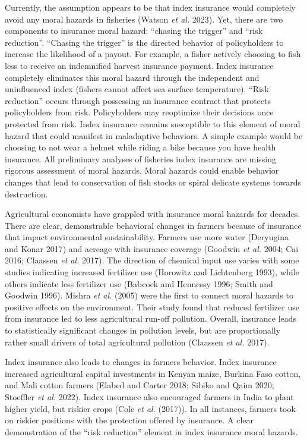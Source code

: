\documentclass[
  letterpaper,
  DIV=11,
  numbers=noendperiod]{scrartcl}
\theoremstyle{plain}
\theoremstyle{plain}
\theoremstyle{remark}
\begin{document}
Currently, the assumption appears to be that index insurance would
completely avoid any moral hazards in fisheries (Watson \emph{et al.}
2023). Yet, there are two components to insurance moral hazard:
``chasing the trigger'' and ``risk reduction''. ``Chasing the trigger''
is the directed behavior of policyholders to increase the likelihood of
a payout. For example, a fisher actively choosing to fish less to
receive an indemnified harvest insurance payment. Index insurance
completely eliminates this moral hazard through the independent and
uninfluenced index (fishers cannot affect sea surface temperature).
``Risk reduction'' occurs through possessing an insurance contract that
protects policyholders from risk. Policyholders may reoptimize their
decisions once protected from risk. Index insurance remains susceptible
to this element of moral hazard that could manifest in maladaptive
behaviors. A simple example would be choosing to not wear a helmet while
riding a bike because you have health insurance. All preliminary
analyses of fisheries index insurance are missing rigorous assessment of
moral hazards. Moral hazards could enable behavior changes that lead to
conservation of fish stocks or spiral delicate systems towards
destruction.

Agricultural economists have grappled with insurance moral hazards for
decades. There are clear, demonstrable behavioral changes in farmers
because of insurance that impact environmental sustainability. Farmers
use more water (Deryugina and Konar 2017) and acreage with insurance
coverage (Goodwin \emph{et al.} 2004; Cai 2016; Claassen \emph{et al.}
2017). The direction of chemical input use varies with some studies
indicating increased fertilizer use (Horowitz and Lichtenberg 1993),
while others indicate less fertilizer use (Babcock and Hennessy 1996;
Smith and Goodwin 1996). Mishra \emph{et al.} (2005) were the first to
connect moral hazards to positive effects on the environment. Their
study found that reduced fertilizer use from insurance led to less
agricultural run-off pollution. Overall, insurance leads to
statistically significant changes in pollution levels, but are
proportionally rather small drivers of total agricultural pollution
(Claassen \emph{et al.} 2017).

Index insurance also leads to changes in farmers behavior. Index
insurance increased agricultural capital investments in Kenyan maize,
Burkina Faso cotton, and Mali cotton farmers (Elabed and Carter 2018;
Sibiko and Qaim 2020; Stoeffler \emph{et al.} 2022). Index insurance
also encouraged farmers in India to plant higher yield, but riskier
crops (Cole \emph{et al.} (2017)). In all instances, farmers took on
riskier positions with the protection offered by insurance. A clear
demonstration of the ``risk reduction'' element in index insurance moral
hazards.
\end{document}
